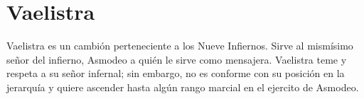\documentclass[10pt,twoside,twocolumn,openany]{dndbook}
\begin{document}
\chapter*{Vaelistra}

Vaelistra es un cambión perteneciente a los Nueve Infiernos. Sirve al mismísimo señor del 
infierno, Asmodeo a quién le sirve como mensajera. Vaelistra teme y respeta a su señor infernal;
sin embargo, no es conforme con su posición en la jerarquía y quiere ascender hasta algún rango 
marcial en el ejercito de Asmodeo.

\end{document}
